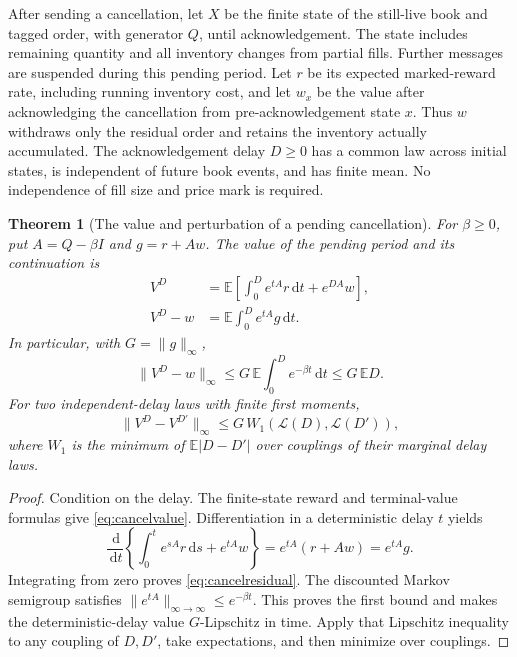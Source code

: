 \documentclass[11pt]{article}
\theoremstyle{plain}
\newtheorem{theorem}{Theorem}[section]
\theoremstyle{definition}
\theoremstyle{remark}
\newcommand{\E}{\mathbb E}
\newcommand{\dd}{\,\mathrm d}
\begin{document}
After sending a cancellation, let \(X\) be the finite state of the
still-live book and tagged order, with generator \(Q\), until
acknowledgement. The state includes remaining quantity and all
inventory changes from partial fills. Further messages are suspended
during this pending period. Let \(r\) be its expected marked-reward
rate, including running inventory cost, and let \(w_x\) be the value
after acknowledging the cancellation from pre-acknowledgement state
\(x\). Thus \(w\) withdraws only the residual order and retains
the inventory actually accumulated. The acknowledgement delay
\(D\ge0\) has a common law across initial states, is independent
of future book events, and has finite mean. No independence of
fill size and price mark is required.

\begin{theorem}[The value and perturbation of a pending cancellation]
\label{thm:cancellationvalue}
For \(\beta\ge0\), put \(A=Q-\beta I\) and \(g=r+Aw\).
The value of the pending period and its continuation is
\begin{align}
 V^D&=\E\left[\int_0^D e^{tA}r\dd t+e^{DA}w\right],
 \label{eq:cancelvalue}\\
 V^D-w&=\E\int_0^D e^{tA}g\dd t .
 \label{eq:cancelresidual}
\end{align}
In particular, with \(G=\|g\|_\infty\),
\[
 \|V^D-w\|_\infty
 \le G\,\E\int_0^D e^{-\beta t}\dd t
 \le G\,\E D.
\]
For two independent-delay laws with finite first moments,
\begin{equation}\label{eq:delaywasserstein}
 \|V^D-V^{D'}\|_\infty
 \le G\,W_1(\mathcal L(D),\mathcal L(D')),
\end{equation}
where \(W_1\) is the minimum of \(\E|D-D'|\) over couplings
of their marginal delay laws.
\end{theorem}
\begin{proof}
Condition on the delay. The finite-state reward and terminal-value
formulas give \eqref{eq:cancelvalue}. Differentiation in a deterministic
delay \(t\) yields
\[
 \frac{\dd}{\dd t}
 \left\{\int_0^t e^{sA}r\dd s+e^{tA}w\right\}
 =e^{tA}(r+Aw)=e^{tA}g.
\]
Integrating from zero proves \eqref{eq:cancelresidual}. The
discounted Markov semigroup satisfies
\(\|e^{tA}\|_{\infty\to\infty}\le e^{-\beta t}\).
This proves the first bound and makes the deterministic-delay
value \(G\)-Lipschitz in time. Apply that Lipschitz inequality to
any coupling of \(D,D'\), take expectations, and then minimize
over couplings.
\end{proof}
\end{document}
